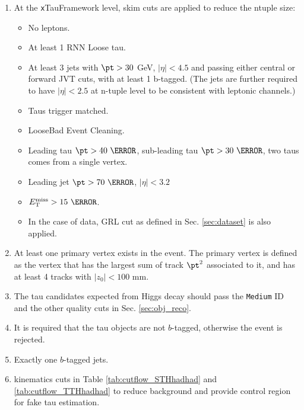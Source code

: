\begin{enumerate}
\item At the {\texttt xTauFramework} level, skim cuts are applied to reduce the ntuple size:
  \begin{itemize}
  \item No leptons.
  \item At least 1 RNN Loose tau.
  \item At least 3 jets with $\pt>30$ GeV, $|\eta|<4.5$ and passing either central or forward JVT cuts, with at least 1 b-tagged. (The jets are further required to have $|\eta|<2.5$ at n-tuple level to be consistent with leptonic channels.)
  \item Taus trigger matched.
  \item LooseBad Event Cleaning.
  \item Leading tau $\pt>40~\GeV$, sub-leading tau $\pt>30~\GeV$, two taus comes from a single vertex.
  \item Leading jet $\pt>70~\GeV$, $|\eta|<3.2$
  \item $\met>15~\GeV$.
  \item In the case of data, GRL cut as defined in Sec. \ref{sec:dataset} is also applied.
  \end{itemize}

\item At least one primary vertex exists in the event. The primary vertex is defined as the vertex that has the largest sum of track $\pt^2$ associated to it, and has at least 4 tracks with $|z_0|<100$ mm.
\item The tau candidates expected from Higgs decay should pass the \texttt{Medium} ID and the other quality cuts in Sec. \ref{sec:obj_reco}.
\item It is required that the tau objects are not $b$-tagged, otherwise the event is rejected.
\item Exactly one $b$-tagged jets. 

\item kinematics cuts in Table \ref{tab:cutflow_STHhadhad} and \ref{tab:cutflow_TTHhadhad} to reduce background and provide control region for fake tau estimation.
\end{enumerate}

